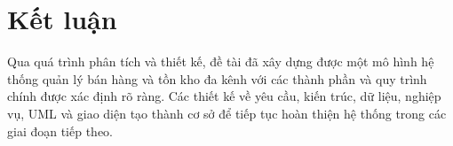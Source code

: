 \section{Kết luận}

Qua quá trình phân tích và thiết kế, đề tài đã xây dựng được một mô hình hệ thống
quản lý bán hàng và tồn kho đa kênh với các thành phần và quy trình chính được xác định
rõ ràng. Các thiết kế về yêu cầu, kiến trúc, dữ liệu, nghiệp vụ, UML và giao diện tạo thành
cơ sở để tiếp tục hoàn thiện hệ thống trong các giai đoạn tiếp theo.
